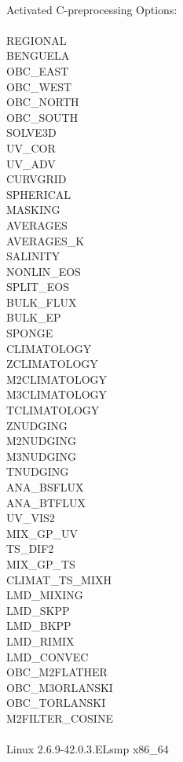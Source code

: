 \\
Activated C-preprocessing Options:\\
\\
REGIONAL\\
BENGUELA\\
OBC\_EAST\\
OBC\_WEST\\
OBC\_NORTH\\
OBC\_SOUTH\\
SOLVE3D\\
UV\_COR\\
UV\_ADV\\
CURVGRID\\
SPHERICAL\\
MASKING\\
AVERAGES\\
AVERAGES\_K\\
SALINITY\\
NONLIN\_EOS\\
SPLIT\_EOS\\
BULK\_FLUX\\
BULK\_EP\\
SPONGE\\
CLIMATOLOGY\\
ZCLIMATOLOGY\\
M2CLIMATOLOGY\\
M3CLIMATOLOGY\\
TCLIMATOLOGY\\
ZNUDGING\\
M2NUDGING\\
M3NUDGING\\
TNUDGING\\
ANA\_BSFLUX\\
ANA\_BTFLUX\\
UV\_VIS2\\
MIX\_GP\_UV\\
TS\_DIF2\\
MIX\_GP\_TS\\
CLIMAT\_TS\_MIXH\\
LMD\_MIXING\\
LMD\_SKPP\\
LMD\_BKPP\\
LMD\_RIMIX\\
LMD\_CONVEC\\
OBC\_M2FLATHER\\
OBC\_M3ORLANSKI\\
OBC\_TORLANSKI\\
M2FILTER\_COSINE\\
\\
Linux 2.6.9-42.0.3.ELsmp x86\_64\\
